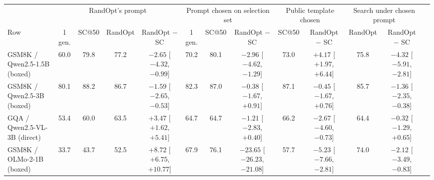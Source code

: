 \begin{tabular}{lcccccccccccc}
\toprule
 & \multicolumn{4}{c}{RandOpt's prompt} & \multicolumn{3}{c}{Prompt chosen on selection set} & \multicolumn{2}{c}{Public template chosen} & \multicolumn{2}{c}{Search under chosen prompt} \\
\cmidrule(lr){2-5}\cmidrule(lr){6-8}\cmidrule(lr){9-10}\cmidrule(lr){11-12}
Row & 1 gen. & SC@50 & RandOpt & RandOpt $-$ SC & 1 gen. & SC@50 & RandOpt $-$ SC & SC@50 & RandOpt $-$ SC & RandOpt & RandOpt $-$ SC \\
\midrule
GSM8K / Qwen2.5-1.5B (boxed) & 60.0 & 79.8 & 77.2 & $-2.65$ {\scriptsize[$-4.32$, $-0.99$]} & 70.2 & 80.1 & $-2.96$ {\scriptsize[$-4.62$, $-1.29$]} & 73.0 & $+4.17$ {\scriptsize[$+1.97$, $+6.44$]} & 75.8 & $-4.32$ {\scriptsize[$-5.91$, $-2.81$]} \\
GSM8K / Qwen2.5-3B (boxed) & 80.1 & 88.2 & 86.7 & $-1.59$ {\scriptsize[$-2.65$, $-0.53$]} & 82.3 & 87.0 & $-0.38$ {\scriptsize[$-1.67$, $+0.91$]} & 87.1 & $-0.45$ {\scriptsize[$-1.67$, $+0.76$]} & 85.7 & $-1.36$ {\scriptsize[$-2.35$, $-0.38$]} \\
GQA / Qwen2.5-VL-3B (direct) & 53.4 & 60.0 & 63.5 & $+3.47$ {\scriptsize[$+1.62$, $+5.41$]} & 64.7 & 64.7 & $-1.21$ {\scriptsize[$-2.83$, $+0.40$]} & 66.2 & $-2.67$ {\scriptsize[$-4.60$, $-0.73$]} & 64.4 & $-0.32$ {\scriptsize[$-1.29$, $+0.65$]} \\
GSM8K / OLMo-2-1B (boxed) & 33.7 & 43.7 & 52.5 & $+8.72$ {\scriptsize[$+6.75$, $+10.77$]} & 67.9 & 76.1 & $-23.65$ {\scriptsize[$-26.23$, $-21.08$]} & 57.7 & $-5.23$ {\scriptsize[$-7.66$, $-2.81$]} & 74.0 & $-2.12$ {\scriptsize[$-3.49$, $-0.83$]} \\
\bottomrule
\end{tabular}
